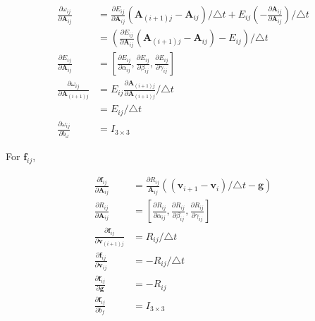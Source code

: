\documentclass[12pt]{article}   %
\begin{document}
\begin{appendices}
\begin{align}
\frac{\partial \omega_{ij}}{\partial \textbf{A}_{ij}} &= \frac{\partial E_{ij}}{\partial \textbf{A}_{ij}} (\textbf{A}_{(i+1)j} - \textbf{A}_{ij})/\triangle t + E_{ij} (- \frac{\partial \textbf{A}_{ij}}{\partial \textbf{A}_{ij}})/\triangle t \nonumber \\
&= (\frac{\partial E_{ij}}{\partial \textbf{A}_{ij}} (\textbf{A}_{(i+1)j} - \textbf{A}_{ij}) - E_{ij})/\triangle t \\
\frac{\partial E_{ij}}{\partial \textbf{A}_{ij}} &= [\frac{\partial E_{ij}}{\partial \alpha_{ij}}, \frac{\partial E_{ij}}{\partial \beta_{ij}}, \frac{\partial E_{ij}}{\partial \gamma_{ij}}] \\
\frac{\partial \omega_{ij}}{\partial \textbf{A}_{(i+1)j}} &= E_{ij} \frac{\partial \textbf{A}_{(i+1)j}}{\partial \textbf{A}_{(i+1)j}}/\triangle t \\
&= E_{ij}/\triangle t \\
\frac{\partial \omega_{ij}}{\partial b_{\omega}} &= I_{3\times 3} 
\end{align}

For $\textbf{f}_{ij}$,

\begin{align}
\frac{\partial \textbf{f}_{ij}}{\partial \textbf{A}_{ij}} &= \frac{\partial R_{ij}} {\textbf{A}_{ij}} ((\textbf{v}_{i+1} - \textbf{v}_i) / \triangle t - \textbf{g}) \\
\frac{\partial R_{ij}}{\partial \textbf{A}_{ij}} &= [\frac{\partial R_{ij}}{\partial \alpha_{ij}}, \frac{\partial R_{ij}}{\partial \beta_{ij}}, \frac{\partial R_{ij}}{\partial \gamma_{ij}}] \\
\frac{\partial \textbf{f}_{ij}}{\partial \textbf{v}_{(i+1)j}} &= R_{ij} / \triangle t \\
\frac{\partial \textbf{f}_{ij}}{\partial \textbf{v}_{ij}} &= - R_{ij} / \triangle t \\
\frac{\partial \textbf{f}_{ij}}{\partial \textbf{g}} &= - R_{ij}\\
\frac{\partial \textbf{f}_{ij}}{\partial b_{f}} &= I_{3\times 3} 
\end{align}


\end{appendices}
\end{document}
